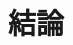 \documentclass[./_thesis]{subfiles}
\begin{document}
\chapter{結論}
\begin{spacing}{2.0}

\end{spacing}
\end{document}
